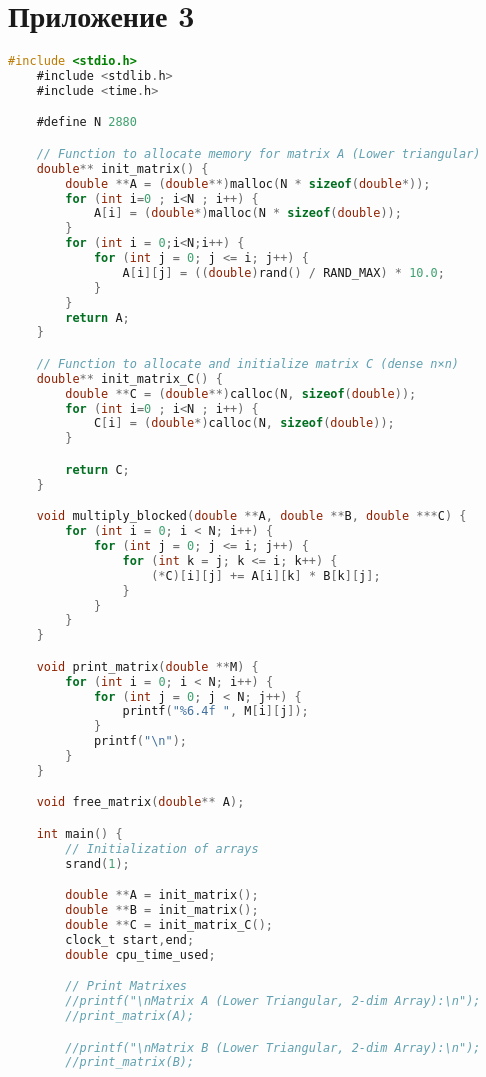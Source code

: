 \documentclass[14pt, russian]{matmex-diploma-custom}
\begin{document}
\section{Приложение 3}
{\footnotesize
\begin{lstlisting}[language=C, caption={Приложение 2D массивов без блочной оптимизации}]
    #include <stdio.h>
    #include <stdlib.h>
    #include <time.h>

    #define N 2880

    // Function to allocate memory for matrix A (Lower triangular)
    double** init_matrix() {
        double **A = (double**)malloc(N * sizeof(double*));
        for (int i=0 ; i<N ; i++) {
            A[i] = (double*)malloc(N * sizeof(double));
        }
        for (int i = 0;i<N;i++) {
            for (int j = 0; j <= i; j++) {
                A[i][j] = ((double)rand() / RAND_MAX) * 10.0;
            }
        }
        return A;
    }

    // Function to allocate and initialize matrix C (dense n×n)
    double** init_matrix_C() {
        double **C = (double**)calloc(N, sizeof(double));
        for (int i=0 ; i<N ; i++) {
            C[i] = (double*)calloc(N, sizeof(double));
        }

        return C;
    }

    void multiply_blocked(double **A, double **B, double ***C) {
        for (int i = 0; i < N; i++) {
            for (int j = 0; j <= i; j++) {
                for (int k = j; k <= i; k++) {
                    (*C)[i][j] += A[i][k] * B[k][j];
                }
            }
        }
    }

    void print_matrix(double **M) {
        for (int i = 0; i < N; i++) {
            for (int j = 0; j < N; j++) {
                printf("%6.4f ", M[i][j]);
            }
            printf("\n");
        }
    }

    void free_matrix(double** A);

    int main() {
        // Initialization of arrays
        srand(1);

        double **A = init_matrix();
        double **B = init_matrix();
        double **C = init_matrix_C();
        clock_t start,end;
        double cpu_time_used;

        // Print Matrixes
        //printf("\nMatrix A (Lower Triangular, 2-dim Array):\n");
        //print_matrix(A);

        //printf("\nMatrix B (Lower Triangular, 2-dim Array):\n");
        //print_matrix(B);


\end{lstlisting}}
\end{document}
